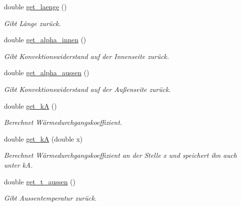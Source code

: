 \begin{DoxyCompactItemize}
\mbox{\label{class_rohr_a191d4b81fcdfc02f9433effdc1fade81}} 
double \hyperlink{class_rohr_a191d4b81fcdfc02f9433effdc1fade81}{get\+\_\+laenge} ()
\begin{DoxyCompactList}\small\item\em Gibt Länge zurück. \end{DoxyCompactList}\item 
\mbox{\label{class_rohr_a8e5ea4e3595b344475e2db45deccd9fd}} 
double \hyperlink{class_rohr_a8e5ea4e3595b344475e2db45deccd9fd}{get\+\_\+alpha\+\_\+innen} ()
\begin{DoxyCompactList}\small\item\em Gibt Konvektionswiderstand auf der Innenseite zurück. \end{DoxyCompactList}\item 
\mbox{\label{class_rohr_ad02b003b17d07ee5f53bc2defbe8227a}} 
double \hyperlink{class_rohr_ad02b003b17d07ee5f53bc2defbe8227a}{get\+\_\+alpha\+\_\+aussen} ()
\begin{DoxyCompactList}\small\item\em Gibt Konvektionswiderstand auf der Außenseite zurück. \end{DoxyCompactList}\item 
double \hyperlink{class_rohr_a29a212b5ffe5723b3c2fe02aba0804c0}{get\+\_\+kA} ()
\begin{DoxyCompactList}\small\item\em Berechnet Wärmedurchgangskoeffizient. \end{DoxyCompactList}\item 
double \hyperlink{class_rohr_a07985e6f4a1d9dc8bfcfe2e5cc9f2a60}{get\+\_\+kA} (double x)
\begin{DoxyCompactList}\small\item\em Berechnet Wärmedurchgangskoeffizient an der Stelle x und speichert ihn auch unter kA. \end{DoxyCompactList}\item 
\mbox{\label{class_rohr_a5d7b97148ffb9e42e5dc9b5657a64cc0}} 
double \hyperlink{class_rohr_a5d7b97148ffb9e42e5dc9b5657a64cc0}{get\+\_\+t\+\_\+aussen} ()
\begin{DoxyCompactList}\small\item\em Gibt Aussentemperatur zurück. \end{DoxyCompactList}\item 

\end{DoxyCompactItemize}
